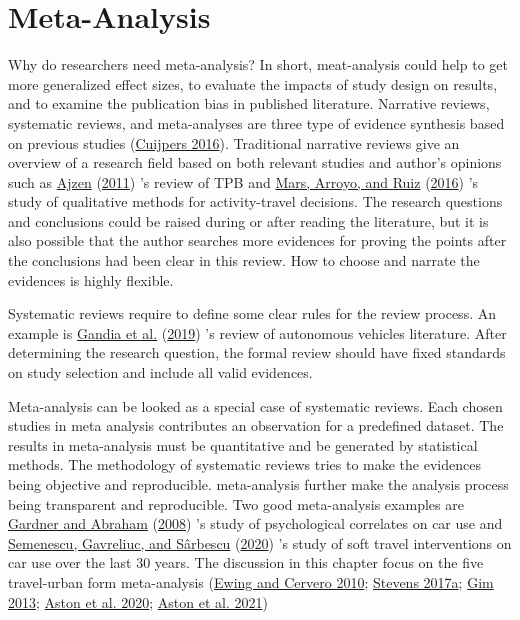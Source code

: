 \documentclass[
  11pt,
  openany]{memoir}
\begin{document}
\hypertarget{meta-analysis}{%
\chapter{Meta-Analysis}\label{meta-analysis}}

Why do researchers need meta-analysis?
In short, meat-analysis could help to get more generalized effect sizes, to evaluate the impacts of study design on results, and to examine the publication bias in published literature.
Narrative reviews, systematic reviews, and meta-analyses are three type of evidence synthesis based on previous studies (\protect\hyperlink{ref-cuijpersMetaanalysesMentalHealth2016}{Cuijpers 2016}).
Traditional narrative reviews give an overview of a research field based on both relevant studies and author's opinions such as \protect\hyperlink{ref-ajzenTheoryPlannedBehaviour2011}{Ajzen} (\protect\hyperlink{ref-ajzenTheoryPlannedBehaviour2011}{2011}) 's review of TPB and \protect\hyperlink{ref-marsQualitativeResearchTravel2016}{Mars, Arroyo, and Ruiz} (\protect\hyperlink{ref-marsQualitativeResearchTravel2016}{2016}) 's study of qualitative methods for activity-travel decisions.
The research questions and conclusions could be raised during or after reading the literature, but it is also possible that the author searches more evidences for proving the points after the conclusions had been clear in this review.
How to choose and narrate the evidences is highly flexible.

Systematic reviews require to define some clear rules for the review process. An example is \protect\hyperlink{ref-gandiaAutonomousVehiclesScientometric2019a}{Gandia et al.} (\protect\hyperlink{ref-gandiaAutonomousVehiclesScientometric2019a}{2019}) 's review of autonomous vehicles literature.
After determining the research question, the formal review should have fixed standards on study selection and include all valid evidences.

Meta-analysis can be looked as a special case of systematic reviews.
Each chosen studies in meta analysis contributes an observation for a predefined dataset.
The results in meta-analysis must be quantitative and be generated by statistical methods.
The methodology of systematic reviews tries to make the evidences being objective and reproducible.
meta-analysis further make the analysis process being transparent and reproducible.
Two good meta-analysis examples are \protect\hyperlink{ref-gardnerPsychologicalCorrelatesCar2008}{Gardner and Abraham} (\protect\hyperlink{ref-gardnerPsychologicalCorrelatesCar2008}{2008}) 's study of psychological correlates on car use and \protect\hyperlink{ref-semenescu30YearsSoft2020}{Semenescu, Gavreliuc, and Sârbescu} (\protect\hyperlink{ref-semenescu30YearsSoft2020}{2020}) 's study of soft travel interventions on car use over the last 30 years.
The discussion in this chapter focus on the five travel-urban form meta-analysis (\protect\hyperlink{ref-ewingTravelBuiltEnvironment2010}{Ewing and Cervero 2010}; \protect\hyperlink{ref-stevensDoesCompactDevelopment2017}{Stevens 2017a}; \protect\hyperlink{ref-gimRelationshipsLandUse2013}{Gim 2013}; \protect\hyperlink{ref-astonStudyDesignImpacts2020}{Aston et al. 2020}; \protect\hyperlink{ref-astonExploringBuiltEnvironment2021}{Aston et al. 2021})
\end{document}
